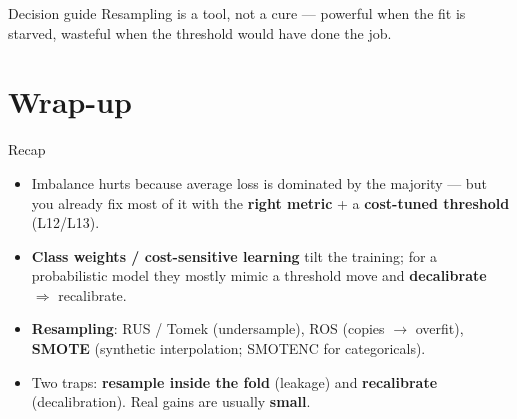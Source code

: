 \documentclass[aspectratio=169]{beamer}
\begin{document}
\begin{frame}{Decision guide}
  \vfill
  \footnotesize Resampling is a tool, not a cure --- powerful when the fit is starved, wasteful when the threshold would have done the job.
\end{frame}

\section*{Wrap-up}

\begin{frame}{Recap}
  \begin{itemize}\small
    \item Imbalance hurts because average loss is dominated by the majority --- but you already
      fix most of it with the \textbf{right metric} + a \textbf{cost-tuned threshold} (L12/L13).
    \item \textbf{Class weights / cost-sensitive learning} tilt the training; for a probabilistic
      model they mostly mimic a threshold move and \textbf{decalibrate} $\Rightarrow$ recalibrate.
    \item \textbf{Resampling}: RUS / Tomek (undersample), ROS (copies $\to$ overfit),
      \textbf{SMOTE} (synthetic interpolation; SMOTENC for categoricals).
    \item Two traps: \textbf{resample inside the fold} (leakage) and \textbf{recalibrate}
      (decalibration). Real gains are usually \textbf{small}.
  \end{itemize}
  \vfill
\end{frame}
\end{document}

